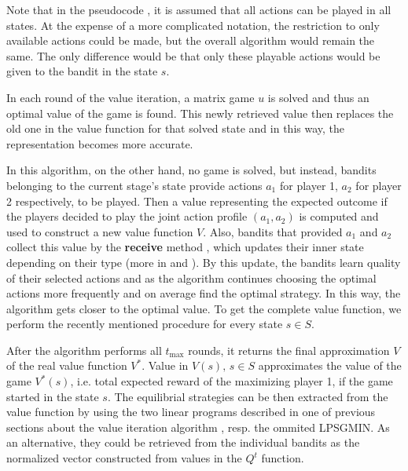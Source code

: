 \documentclass[../main.tex]{subfiles}
\begin{document}
Note that in the pseudocode , it is assumed that all actions can be played in all states.
At the expense of a more complicated notation, the restriction to only available actions could be made, but the overall algorithm would remain the same.
The only difference would be that only these playable actions would be given to the bandit in the state $s$.

In each round of the value iteration, a matrix game $u$  is solved and thus an optimal value of the game is found.
This newly retrieved value then replaces the old one in the value function for that solved state and in this way, the representation becomes more accurate.

In this algorithm, on the other hand, no game is solved, but instead, bandits belonging to the current stage's state provide actions $a_1$ for player 1, $a_2$ for player 2 respectively, to be played.
Then a value representing the expected outcome if the players decided to play the joint action profile $(a_1, a_2)$ is computed and used to construct a new value function $V$.
Also, bandits that provided $a_1$ and $a_2$ collect this value by the \textbf{receive} method , which updates their inner state depending on their type (more in  and ).
By this update, the bandits learn quality of their selected actions and as the algorithm continues choosing the optimal actions more frequently and on average find the optimal strategy.
In this way, the algorithm gets closer to the optimal value.
To get the complete value function, we perform the recently mentioned procedure for every state $s \in S$.

After the algorithm performs all $t_{\text{max}}$ rounds, it returns the final approximation $V$ of the real value function $V^{*}$.
Value in $V(s),\, s \in S$ approximates the value of the game $V^*(s)$, i.e. total expected reward of the maximizing player 1, if the game started in the state $s$.
The equilibrial strategies can be then extracted from the value function by using the two linear programs described in one of previous sections about the value iteration algorithm , resp. the ommited LPSGMIN.
As an alternative, they could be retrieved from the individual bandits as the normalized vector constructed from values in the $Q^t$ function.
\end{document}
